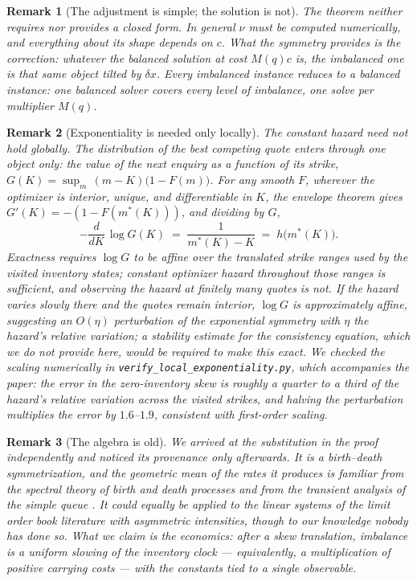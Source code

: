 \documentclass[11pt]{article}
\newtheorem{remark}{Remark}
\begin{document}
\begin{remark}[The adjustment is simple; the solution is not]
The theorem neither requires nor provides a closed form. In general $\nu$ must be computed numerically, and everything about its shape depends on $c$. What the symmetry provides is the correction: whatever the balanced solution at cost $M(q)c$ is, the imbalanced one is that same object tilted by $\delta x$. Every imbalanced instance reduces to a balanced instance: one balanced \emph{solver} covers every level of imbalance, one solve per multiplier $M(q)$.
\end{remark}

\begin{remark}[Exponentiality is needed only locally]\label{rem:local}
The constant hazard need not hold globally. The distribution of the best competing quote enters through one object only: the value of the next enquiry as a function of its strike, $G(K) = \sup_{m}\,(m-K)\big(1-F(m)\big)$. For any smooth $F$, wherever the optimizer is interior, unique, and differentiable in $K$, the envelope theorem gives $G'(K) = -(1-F(m^{*}(K)))$, and dividing by $G$,
\[
-\frac{d}{dK}\,\log G(K) \;=\; \frac{1}{m^{*}(K)-K} \;=\; h\big(m^{*}(K)\big).
\]
Exactness requires $\log G$ to be affine over the translated strike ranges used by the visited inventory states; constant optimizer hazard throughout those ranges is sufficient, and observing the hazard at finitely many quotes is not. If the hazard varies slowly there and the quotes remain interior, $\log G$ is approximately affine, suggesting an $O(\eta)$ perturbation of the exponential symmetry with $\eta$ the hazard's relative variation; a stability estimate for the consistency equation, which we do not provide here, would be required to make this exact. We checked the scaling numerically in \texttt{verify\_local\_exponentiality.py}, which accompanies the paper: the error in the zero-inventory skew is roughly a quarter to a third of the hazard's relative variation across the visited strikes, and halving the perturbation multiplies the error by $1.6$--$1.9$, consistent with first-order scaling.
\end{remark}

\begin{remark}[The algebra is old]
We arrived at the substitution in the proof independently and noticed its provenance only afterwards. It is a birth--death symmetrization, and the geometric mean of the rates it produces is familiar from the spectral theory of birth and death processes \cite{ledermann1954,karlinmcgregor1957} and from the transient analysis of the simple queue \cite{bailey1954}. It could equally be applied to the linear systems of the limit order book literature with asymmetric intensities, though to our knowledge nobody has done so. What we claim is the economics: after a skew translation, imbalance is a uniform slowing of the inventory clock --- equivalently, a multiplication of positive carrying costs --- with the constants tied to a single observable.
\end{remark}
\end{document}
